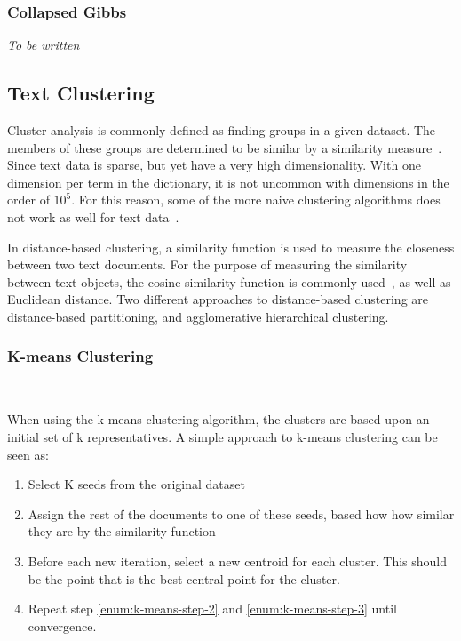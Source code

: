 \subsubsection{Collapsed Gibbs}

\textit{To be written}

\subsection{Text Clustering}

Cluster analysis is commonly defined as finding groups in a given dataset.
The members of these groups are determined to be similar by a similarity measure~\cite{kaufman2009finding, aggarwal2012survey}.
Since text data is sparse, but yet have a very high dimensionality.
With one dimension per term in the dictionary, it is not uncommon with dimensions in the order of $10^5$.
For this reason, some of the more naive clustering algorithms does not work as well for text data~\cite{aggarwal2012survey}.

In distance-based clustering, a similarity function is used to measure the closeness between two text documents.
For the purpose of measuring the similarity between text objects, the cosine similarity function is commonly used~\cite{aggarwal2012survey}, as well as Euclidean distance.
Two different approaches to distance-based clustering are distance-based partitioning, and agglomerative hierarchical clustering.

\subsubsection{K-means Clustering}~\label{sec:k-means}

When using the k-means clustering algorithm, the clusters are based upon an initial set of k representatives.
A simple approach to k-means clustering can be seen as:

\begin{enumerate}
    \item Select K seeds from the original dataset
    \item \label{enum:k-means-step-2} Assign the rest of the documents to one of these seeds, based how how similar they are by the similarity function
    \item \label{enum:k-means-step-3} Before each new iteration, select a new centroid for each cluster. This should be the point that is the best central point for the cluster.
    \item Repeat step \ref{enum:k-means-step-2} and \ref{enum:k-means-step-3} until convergence.
\end{enumerate}

